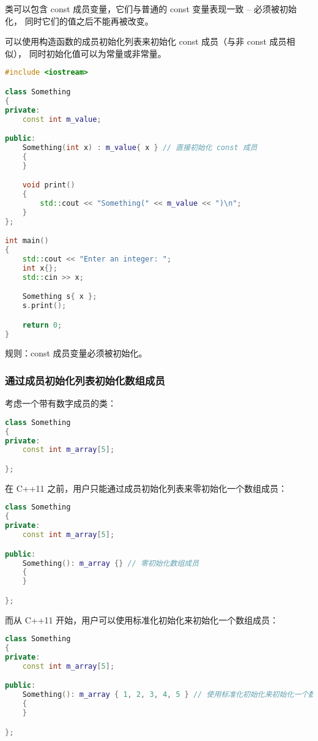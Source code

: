 \documentclass[../../LearnCpp.tex]{subfiles}
\begin{document}
类可以包含 const 成员变量，它们与普通的 const 变量表现一致 -- 必须被初始化，
同时它们的值之后不能再被改变。

可以使用构造函数的成员初始化列表来初始化 const 成员（与非 const 成员相似），
同时初始化值可以为常量或非常量。

\begin{lstlisting}[language=C++]
#include <iostream>

class Something
{
private:
    const int m_value;

public:
    Something(int x) : m_value{ x } // 直接初始化 const 成员
    {
    }

    void print()
    {
        std::cout << "Something(" << m_value << ")\n";
    }
};

int main()
{
    std::cout << "Enter an integer: ";
    int x{};
    std::cin >> x;

    Something s{ x };
    s.print();

    return 0;
}
\end{lstlisting}

规则：const 成员变量必须被初始化。

\subsubsection*{通过成员初始化列表初始化数组成员}

考虑一个带有数字成员的类：

\begin{lstlisting}[language=C++]
class Something
{
private:
    const int m_array[5];

};
\end{lstlisting}

在 C++11 之前，用户只能通过成员初始化列表来零初始化一个数组成员：

\begin{lstlisting}[language=C++]
class Something
{
private:
    const int m_array[5];

public:
    Something(): m_array {} // 零初始化数组成员
    {
    }

};
\end{lstlisting}

而从 C++11 开始，用户可以使用标准化初始化来初始化一个数组成员：

\begin{lstlisting}[language=C++]
class Something
{
private:
    const int m_array[5];

public:
    Something(): m_array { 1, 2, 3, 4, 5 } // 使用标准化初始化来初始化一个数组成员
    {
    }

};
\end{lstlisting}
\end{document}
